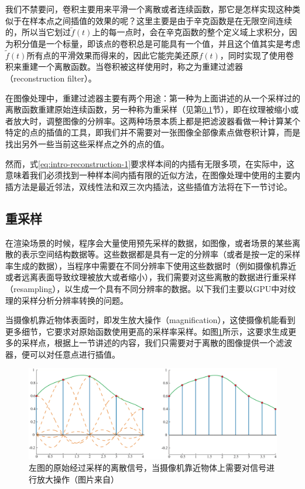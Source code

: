 我们不禁要问，卷积主要用来平滑一个离散或者连续函数，那它是怎样实现这种类似于在样本点之间插值的效果的呢？这里主要是由于辛克函数是在无限空间连续的，所以当它划过$\tilde{f}(t)$上的每一点时，会在辛克函数的整个定义域上求积分，因为积分值是一个标量，即该点的卷积总是可能具有一个值，并且这个值其实是考虑$\tilde{f}(t)$所有点的平滑效果而得来的，因此它能完美还原$f(t)$，同时实现了使用卷积来重建一个离散函数。当卷积被这样使用时，称之为重建过滤器（reconstruction filter）。

在图像处理中，重建过滤器主要有两个用途：第一种为上面讲述的从一个采样过的离散函数重建原始连续函数，另一种称为重采样（见第\ref{sec:intro-resampling}节），即在纹理被缩小或者放大时，调整图像的分辨率。这两种场景本质上都是把滤波器看做一种计算某个特定的点的插值的工具，即我们并不需要对一张图像全部像素点做卷积计算，而是找出另外一些当前这些采样点之外的点的值。

然而，式\ref{eq:intro-reconstruction-1}要求样本间的内插有无限多项，在实际中，这意味着我们必须找到一种样本间内插有限的近似方法，在图像处理中使用的主要内插方法是最近邻法，双线性法和双三次内插法，这些插值方法将在下一节讨论。





\subsection{重采样}\label{sec:intro-resampling}
在渲染场景的时候，程序会大量使用预先采样的数据，如图像，或者场景的某些离散的表示空间结构数据等。这些数据都是具有一定的分辨率（或者是按一定的采样率生成的数据），当程序中需要在不同分辨率下使用这些数据时（例如摄像机靠近或者远离表面导致纹理被放大或者缩小），我们需要对这些离散的数据进行重采样（resampling），以生成一个具有不同分辨率的数据。以下我们主要以GPU中对纹理的采样分析分辨率转换的问题。

当摄像机靠近物体表面时，即发生放大操作（magnification），这使摄像机能看到更多细节，它要求对原始函数使用更高的采样率采样。如图\ref{f:intro-magnification}所示，这要求生成更多的采样点，根据上一节讲述的内容，我们只需要对于离散的图像提供一个滤波器，便可以对任意点进行插值。

\begin{figure}
\begin{fullwidth}
	\includegraphics[width=\thewidth]{figures/intro/magnification}
	\caption{左图的原始经过采样的离散信号，当摄像机靠近物体上需要对信号进行放大操作（图片来自\cite{b:rtr}）}
	\label{f:intro-magnification}
\end{fullwidth}
\end{figure}


